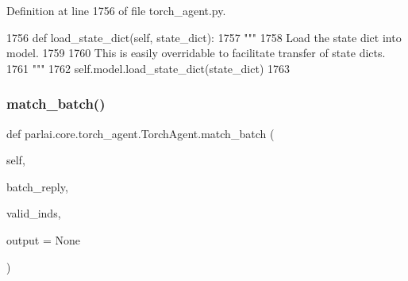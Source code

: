 Definition at line 1756 of file torch\+\_\+agent.\+py.


\begin{DoxyCode}
1756     \textcolor{keyword}{def }load\_state\_dict(self, state\_dict):
1757         \textcolor{stringliteral}{"""}
1758 \textcolor{stringliteral}{        Load the state dict into model.}
1759 \textcolor{stringliteral}{}
1760 \textcolor{stringliteral}{        This is easily overridable to facilitate transfer of state dicts.}
1761 \textcolor{stringliteral}{        """}
1762         self.model.load\_state\_dict(state\_dict)
1763 
\end{DoxyCode}
\mbox{\label{classparlai_1_1core_1_1torch__agent_1_1TorchAgent_aba56b961d929e5c5b5da9cf8bd331502}} 
\subsubsection{\texorpdfstring{match\+\_\+batch()}{match\_batch()}}
{\footnotesize\ttfamily def parlai.\+core.\+torch\+\_\+agent.\+Torch\+Agent.\+match\+\_\+batch (\begin{DoxyParamCaption}\item[{}]{self,  }\item[{}]{batch\+\_\+reply,  }\item[{}]{valid\+\_\+inds,  }\item[{}]{output = {\ttfamily None} }\end{DoxyParamCaption})}

